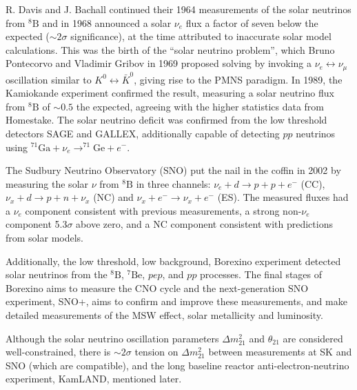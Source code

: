 R. Davis and J. Bachall continued their 1964 measurements\cite{davis} of the solar neutrinos from $^{8}\text{B}$ and in 1968\cite{davis_sun} announced a solar $\nu_e$ flux a factor of seven below the expected ($\sim2\sigma$ significance), at the time attributed to inaccurate solar model calculations. This was the birth of the ``solar neutrino problem'', which Bruno Pontecorvo and Vladimir Gribov in 1969\cite{pontecorvo_gribov} proposed solving by invoking a $\nu_e\leftrightarrow\nu_\mu$ oscillation similar to $K^0 \leftrightarrow\bar{K}^0$, giving rise to the PMNS paradigm. In 1989, the Kamiokande experiment\cite{kamiokande_solar} confirmed the result, measuring a solar neutrino flux from $^{8}\text{B}$  of $\sim0.5$ the expected, agreeing with the higher statistics data from Homestake\cite{davis_sun2}. The solar neutrino deficit was confirmed from the low threshold detectors SAGE\cite{sage_solar} and GALLEX\cite{gallex_solar}, additionally capable of detecting $p p$ neutrinos using $^{71}\text{Ga}+\nu_e \rightarrow ^{71}\text{Ge}+e^-$.

The Sudbury Neutrino Observatory (SNO) put the nail in the coffin in 2002\cite{sno_solar} by measuring the solar $\nu$ from $^{8}\text{B}$ in three channels: $\nu_e + d \rightarrow p+p+e^-$ (CC), $\nu_x + d\rightarrow p+ n + \nu_x$ (NC) and $\nu_x + e^- \rightarrow \nu_x+e^-$ (ES). The measured fluxes had a $\nu_e$ component consistent with previous measurements, a strong non-$\nu_e$ component 5.3$\sigma$ above zero, and a NC component consistent with predictions from solar models.

Additionally, the low threshold, low background, Borexino experiment detected solar neutrinos from the $^{8}\text{B}$, $^{7}\text{Be}$, $pep$, and $pp$ processes\cite{borexino_summary}. The final stages of Borexino aims to measure the CNO cycle and the next-generation SNO experiment, SNO+, aims to confirm and improve these measurements, and make detailed measurements of the MSW effect, solar metallicity and luminosity.

Although the solar neutrino oscillation parameters $\Delta m^2_{21}$ and $\theta_{21}$ are considered well-constrained, there is $\sim 2\sigma$ tension on $\Delta m^2_{21}$ between measurements at SK and SNO (which are compatible), and the long baseline reactor anti-electron-neutrino experiment, KamLAND\cite{m2_tension}, mentioned later.

